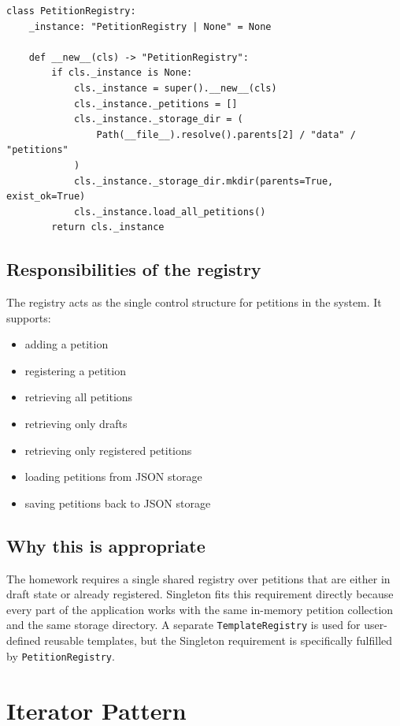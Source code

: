 \documentclass[11pt,a4paper]{article}
\begin{document}
\begin{lstlisting}[style=pythonstyle,caption={Singleton registry creation logic}]
class PetitionRegistry:
    _instance: "PetitionRegistry | None" = None

    def __new__(cls) -> "PetitionRegistry":
        if cls._instance is None:
            cls._instance = super().__new__(cls)
            cls._instance._petitions = []
            cls._instance._storage_dir = (
                Path(__file__).resolve().parents[2] / "data" / "petitions"
            )
            cls._instance._storage_dir.mkdir(parents=True, exist_ok=True)
            cls._instance.load_all_petitions()
        return cls._instance
\end{lstlisting}

\subsection{Responsibilities of the registry}

The registry acts as the single control structure for petitions in the system.
It supports:
\begin{itemize}[leftmargin=1.5em]
    \item adding a petition
    \item registering a petition
    \item retrieving all petitions
    \item retrieving only drafts
    \item retrieving only registered petitions
    \item loading petitions from JSON storage
    \item saving petitions back to JSON storage
\end{itemize}

\subsection{Why this is appropriate}

The homework requires a single shared registry over petitions that are either in
draft state or already registered. Singleton fits this requirement directly
because every part of the application works with the same in-memory petition
collection and the same storage directory. A separate \texttt{TemplateRegistry}
is used for user-defined reusable templates, but the Singleton requirement is
specifically fulfilled by \texttt{PetitionRegistry}.

\section{Iterator Pattern}
\end{document}
